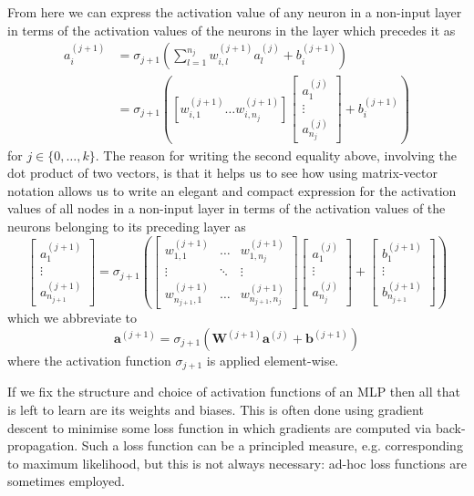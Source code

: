\documentclass[11pt]{article}
\begin{document}
\noindent From here we can express the activation value of any neuron in a non-input layer in terms of the activation values of the neurons in the layer which precedes it as
\begin{align*}
    a_i^{(j+1)}
    &=
    \sigma_{j+1}\left(
    \sum_{l=1}^{n_j} w_{i,l}^{(j+1)}a_l^{(j)} + b_i^{(j+1)}
    \right)\\
    &=
    \sigma_{j+1}\left(
    \left[w_{i,1}^{(j+1)} \dots w_{i,n_j}^{(j+1)}\right]
    \begin{bmatrix}
        a_1^{(j)}\\
        \vdots\\
        a_{n_j}^{(j)}
    \end{bmatrix}
    +
    b_i^{(j+1)}
\right)
\end{align*}
for $j\in\{0,\dots,k\}$. The reason for writing the second equality above, involving the dot product of two vectors, is that it helps us to see how using matrix-vector notation allows us to write an elegant and compact expression for the activation values of all nodes in a non-input layer in terms of the activation values of the neurons belonging to its preceding layer as
$$
\begin{bmatrix}
    a_1^{(j+1)}\\
    \vdots\\
    a_{n_{j+1}}^{(j+1)}
\end{bmatrix}
=
\sigma_{j+1}\left(
\begin{bmatrix}
    w_{1,1}^{(j+1)} & \dots & w_{1,n_j}^{(j+1)}\\
    \vdots & \ddots & \vdots\\
    w_{n_{j+1},1}^{(j+1)} & \dots & w_{n_{j+1},n_j}^{(j+1)}
\end{bmatrix}
\begin{bmatrix}
    a_1^{(j)}\\
    \vdots\\
    a_{n_j}^{(j)}
\end{bmatrix}
+
\begin{bmatrix}
    b_1^{(j+1)}\\
    \vdots\\
    b_{n_{j+1}}^{(j+1)}
\end{bmatrix}
\right)
$$
which we abbreviate to
$$
\mathbf{a}^{(j+1)}=\sigma_{j+1}\left(\mathbf{W}^{(j+1)}\mathbf{a}^{(j)}+\mathbf{b}^{(j+1)}\right)
$$
where the activation function $\sigma_{j+1}$ is applied element-wise.

If we fix the structure and choice of activation functions of an MLP then all that is left to learn are its weights and biases. This is often done using gradient descent to minimise some loss function in which gradients are computed via back-propagation. Such a loss function can be a principled measure, e.g. corresponding to maximum likelihood, but this is not always necessary: ad-hoc loss functions are sometimes employed.
\end{document}
